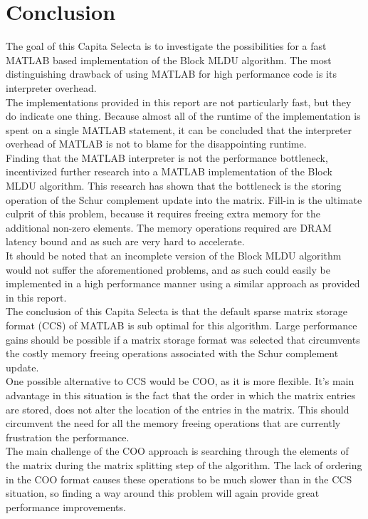\chapter{Conclusion}

The goal of this Capita Selecta is to investigate the possibilities for a fast MATLAB based implementation of the Block MLDU algorithm. The most distinguishing drawback of using MATLAB for high performance code is its interpreter overhead.\\

\noindent The implementations provided in this report are not particularly fast, but they do indicate one thing. Because almost all of the runtime of the implementation is spent on a single MATLAB statement, it can be concluded that the interpreter overhead of MATLAB is not to blame for the disappointing runtime.\\

\noindent Finding that the MATLAB interpreter is not the performance bottleneck, incentivized further research into a MATLAB implementation of the Block MLDU algorithm. This research has shown that the bottleneck is the storing operation of the Schur complement update into the matrix. Fill-in is the ultimate culprit of this problem, because it requires freeing extra memory for the additional non-zero elements. The memory operations required are DRAM latency bound and as such are very hard to accelerate.\\

\noindent It should be noted that an incomplete version of the Block MLDU algorithm would not suffer the aforementioned problems, and as such could easily be implemented in a high performance manner using a similar approach as provided in this report.\\

\noindent The conclusion of this Capita Selecta is that the default sparse matrix storage format (CCS) of MATLAB is sub optimal for this algorithm. Large performance gains should be possible if a matrix storage format was selected that circumvents the costly memory freeing operations associated with the Schur complement update.\\

\noindent One possible alternative to CCS would be COO, as it is more flexible. It's main advantage in this situation is the fact that the order in which the matrix entries are stored, does not alter the location of the entries in the matrix. This should circumvent the need for all the memory freeing operations that are currently frustration the performance.\\

\noindent The main challenge of the COO approach is searching through the elements of the matrix during the matrix splitting step of the algorithm. The lack of ordering in the COO format causes these operations to be much slower than in the CCS situation, so finding a way around this problem will again provide great performance improvements. 